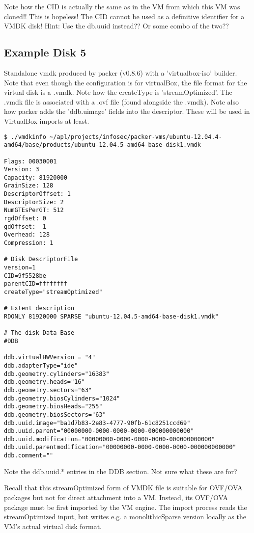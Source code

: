 \documentclass{article}
\begin{document}
Note how the CID is actually the same as in the VM from which this VM
was cloned!!  This is hopeless!  The CID cannot be used as a
definitive identifier for a VMDK disk!  Hint: Use the db.uuid
instead??  Or some combo of the two??

\subsection{Example Disk 5}

Standalone vmdk produced by packer (v0.8.6) with a 'virtualbox-iso'
builder.  Note that even though the configuration is for virtualBox,
the file format for the virtual disk is a .vmdk.  Note how the
createType is 'streamOptimized'.  The .vmdk file is associated with a
.ovf file (found alongside the .vmdk).  Note also how packer adds the
'ddb.uimage' fields into the descriptor.  These will be used in
VirtualBox imports at least.

\begin{verbatim}
$ ./vmdkinfo ~/apl/projects/infosec/packer-vms/ubuntu-12.04.4-amd64/base/products/ubuntu-12.04.5-amd64-base-disk1.vmdk 

Flags: 00030001
Version: 3
Capacity: 81920000
GrainSize: 128
DescriptorOffset: 1
DescriptorSize: 2
NumGTEsPerGT: 512
rgdOffset: 0
gdOffset: -1
Overhead: 128
Compression: 1

# Disk DescriptorFile
version=1
CID=9f5528be
parentCID=ffffffff
createType="streamOptimized"

# Extent description
RDONLY 81920000 SPARSE "ubuntu-12.04.5-amd64-base-disk1.vmdk"

# The disk Data Base 
#DDB

ddb.virtualHWVersion = "4"
ddb.adapterType="ide"
ddb.geometry.cylinders="16383"
ddb.geometry.heads="16"
ddb.geometry.sectors="63"
ddb.geometry.biosCylinders="1024"
ddb.geometry.biosHeads="255"
ddb.geometry.biosSectors="63"
ddb.uuid.image="ba1d7b83-2e83-4777-90fb-61c8251ccd69"
ddb.uuid.parent="00000000-0000-0000-0000-000000000000"
ddb.uuid.modification="00000000-0000-0000-0000-000000000000"
ddb.uuid.parentmodification="00000000-0000-0000-0000-000000000000"
ddb.comment=""
\end{verbatim}

Note the ddb.uuid.* entries in the DDB section.  Not sure what these
are for?

Recall that this streamOptimized form of VMDK file is suitable for
OVF/OVA packages but not for direct attachment into a VM.  Instead,
its OVF/OVA package must be first imported by the VM engine.  The
import process reads the streamOptimized input, but writes e.g. a
monolithicSparse version locally as the VM's actual virtual disk
format.
\end{document}
